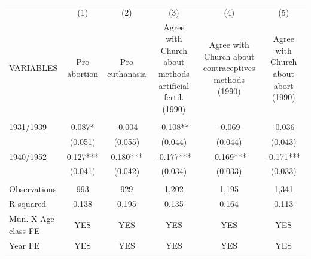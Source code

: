 \begin{tabular}{lccccc} \hline
 & (1) & (2) & (3) & (4) & (5) \\
VARIABLES & Pro abortion & Pro euthanasia & Agree with Church about methods artificial fertil. (1990) & Agree with Church about contraceptives methods (1990) & Agree with Church about abort (1990) \\ \hline
 &  &  &  &  &  \\
1931/1939 & 0.087* & -0.004 & -0.108** & -0.069 & -0.036 \\
 & (0.051) & (0.055) & (0.044) & (0.044) & (0.043) \\
1940/1952 & 0.127*** & 0.180*** & -0.177*** & -0.169*** & -0.171*** \\
 & (0.041) & (0.042) & (0.034) & (0.033) & (0.033) \\
 &  &  &  &  &  \\
Observations & 993 & 929 & 1,202 & 1,195 & 1,341 \\
R-squared & 0.138 & 0.195 & 0.135 & 0.164 & 0.113 \\
Mun. X Age class FE & YES & YES & YES & YES & YES \\
 Year FE & YES & YES & YES & YES & YES \\ \hline
\end{tabular}
